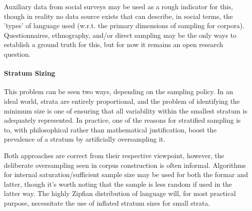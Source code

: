 Auxiliary data from social surveys may be used as a rough indicator for this, though in reality no data source exists that can describe, in social terms, the 'types' of language used (w.r.t. the primary dimensions of sampling for corpora).  Questionnaires, ethnography, and/or direct sampling may be the only ways to establish a ground truth for this, but for now it remains an open research question.%










\paragraph{Stratum Sizing}
This problem can be seen two ways, depending on the sampling policy.  In an ideal world, strata are entirely proportional, and the problem of identifying the minimum size is one of ensuring that all variability within the smallest stratum is adequately represented.  In practice, one of the reasons for stratified sampling is to, with philosophical rather than mathematical justification, boost the prevalence of a stratum by artificially oversampling it.

Both approaches are correct from their respective viewpoint, however, the deliberate oversampling seen in corpus construction is often informal.  Algorithms for internal saturation/sufficient sample size may be used for both the formar and latter, though it's worth noting that the sample is less random if used in the latter way.  The highly Zipfian distribution of language will, for most practical purpose, necessitate the use of inflated stratum sizes for small strata.



